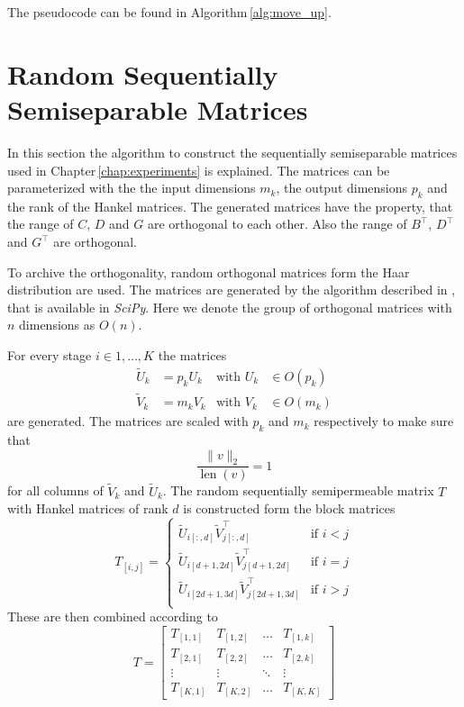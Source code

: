 \documentclass[doctype=mastersthesis,BCOR=15mm,biblatex]{ldvbook}%
\DeclareMathOperator{\length}{len}
\begin{document}
The pseudocode can be found in Algorithm\,\ref{alg:move_up}.

\chapter{Random Sequentially Semiseparable Matrices}\label{A:random_T}

In this section the algorithm to construct the sequentially semiseparable matrices used in Chapter\,\ref{chap:experiments} is explained.
The matrices can be parameterized with the the input dimensions $m_k$, the output dimensions $p_k$ and the rank of the  Hankel matrices.
The generated matrices have the property, that the range of $C$, $D$ and $G$ are orthogonal to each other.
Also the range of $B^\top$, $D^\top$ and $G^\top$ are orthogonal.


To archive the orthogonality, random orthogonal matrices form the Haar distribution are used.
The matrices are generated by the algorithm described in \cite{mezzadri_how_2007}, that is available in \emph{SciPy}.
Here we denote the group of orthogonal matrices with $n$ dimensions as $O(n)$.

For every stage $i \in 1, \dots ,K$ the matrices 
\begin{align}
	\tilde{U}_k &=p_k U_k  & \text{with } U_k &\in O(p_k)\\
	\tilde{V}_k &=m_k V_k  & \text{with } V_k &\in O(m_k)
\end{align}
are generated.
The matrices are scaled with $p_k$ and $m_k$ respectively to make sure that 
\begin{equation}
	\frac{\|v\|_2}{\length(v)} = 1  
\end{equation}
for all columns of $\tilde{V}_k$ and $\tilde{U}_k$.
The random sequentially semipermeable matrix $T$ with Hankel matrices of rank $d$ is constructed form the block matrices 
\begin{equation}
	T_{[i,j]} = 
	\begin{cases}
	\tilde{U}_{i[:,d]} \tilde{V}_{j[:,d]}^\top & \text{if } i<j\\
	\tilde{U}_{i[d+1,2d]} \tilde{V}_{j[d+1,2d]}^\top & \text{if } i=j\\
	\tilde{U}_{i[2d+1,3d]} \tilde{V}_{j[2d+1,3d]}^\top & \text{if } i>j\\
	\end{cases}
\end{equation}
These are then combined according to 
\begin{equation}
	T = \begin{bmatrix}
	T_{[1,1]} & T_{[1,2]} & \dots & T_{[1,k]}\\
	T_{[2,1]} & T_{[2,2]} & \dots & T_{[2,k]}\\
	\vdots & \vdots & \ddots &\vdots\\
	T_{[K,1]} & T_{[K,2]} & \dots & T_{[K,K]}
	\end{bmatrix}
\end{equation}

\printbibliography{}
\end{document}
